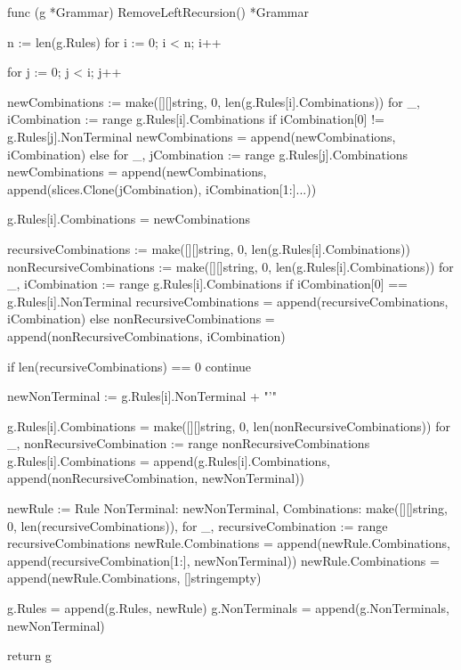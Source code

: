 func (g *Grammar) RemoveLeftRecursion() *Grammar {
	n := len(g.Rules)
	for i := 0; i < n; i++ {
		for j := 0; j < i; j++ {
			newCombinations := make([][]string, 0, len(g.Rules[i].Combinations))
			for _, iCombination := range g.Rules[i].Combinations {
				if iCombination[0] != g.Rules[j].NonTerminal {
					newCombinations = append(newCombinations, iCombination)
				} else {
					for _, jCombination := range g.Rules[j].Combinations {
						newCombinations = append(newCombinations, append(slices.Clone(jCombination), iCombination[1:]...))
					}
				}
			}

			g.Rules[i].Combinations = newCombinations
		}

		recursiveCombinations := make([][]string, 0, len(g.Rules[i].Combinations))
		nonRecursiveCombinations := make([][]string, 0, len(g.Rules[i].Combinations))
		for _, iCombination := range g.Rules[i].Combinations {
			if iCombination[0] == g.Rules[i].NonTerminal {
				recursiveCombinations = append(recursiveCombinations, iCombination)
			} else {
				nonRecursiveCombinations = append(nonRecursiveCombinations, iCombination)
			}
		}

		if len(recursiveCombinations) == 0 {
			continue
		}

		newNonTerminal := g.Rules[i].NonTerminal + "'"

		g.Rules[i].Combinations = make([][]string, 0, len(nonRecursiveCombinations))
		for _, nonRecursiveCombination := range nonRecursiveCombinations {
			g.Rules[i].Combinations = append(g.Rules[i].Combinations, append(nonRecursiveCombination, newNonTerminal))
		}

		newRule := Rule{
			NonTerminal:  newNonTerminal,
			Combinations: make([][]string, 0, len(recursiveCombinations)),
		}
		for _, recursiveCombination := range recursiveCombinations {
			newRule.Combinations = append(newRule.Combinations, append(recursiveCombination[1:], newNonTerminal))
		}
		newRule.Combinations = append(newRule.Combinations, []string{empty})

		g.Rules = append(g.Rules, newRule)
		g.NonTerminals = append(g.NonTerminals, newNonTerminal)
	}

	return g
}